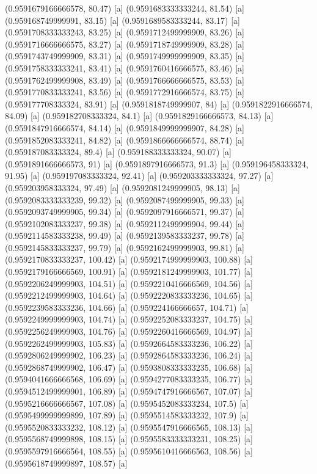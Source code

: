 {{{(0.9591679166666578, 80.47) [a] 
(0.9591683333333244, 81.54) [a] 
(0.959168749999991, 83.15) [a] 
(0.9591689583333244, 83.17) [a] 
(0.9591708333333243, 83.25) [a] 
(0.9591712499999909, 83.26) [a] 
(0.9591716666666575, 83.27) [a] 
(0.9591718749999909, 83.28) [a] 
(0.9591743749999909, 83.31) [a] 
(0.9591749999999909, 83.35) [a] 
(0.9591758333333241, 83.41) [a] 
(0.9591760416666575, 83.46) [a] 
(0.9591762499999908, 83.49) [a] 
(0.9591766666666575, 83.53) [a] 
(0.9591770833333241, 83.56) [a] 
(0.9591772916666574, 83.75) [a] 
(0.959177708333324, 83.91) [a] 
(0.9591818749999907, 84) [a] 
(0.9591822916666574, 84.09) [a] 
(0.959182708333324, 84.1) [a] 
(0.9591829166666573, 84.13) [a] 
(0.9591847916666574, 84.14) [a] 
(0.9591849999999907, 84.28) [a] 
(0.9591852083333241, 84.82) [a] 
(0.9591866666666574, 88.74) [a] 
(0.959187083333324, 89.4) [a] 
(0.959188333333324, 90.07) [a] 
(0.9591891666666573, 91) [a] 
(0.9591897916666573, 91.3) [a] 
(0.959196458333324, 91.95) [a] 
(0.959197083333324, 92.41) [a] 
(0.959203333333324, 97.27) [a] 
(0.959203958333324, 97.49) [a] 
(0.9592081249999905, 98.13) [a] 
(0.9592083333333239, 99.32) [a] 
(0.9592087499999905, 99.33) [a] 
(0.9592093749999905, 99.34) [a] 
(0.9592097916666571, 99.37) [a] 
(0.9592102083333237, 99.38) [a] 
(0.9592112499999904, 99.44) [a] 
(0.9592114583333238, 99.49) [a] 
(0.9592139583333237, 99.78) [a] 
(0.9592145833333237, 99.79) [a] 
(0.9592162499999903, 99.81) [a] 
(0.9592170833333237, 100.42) [a] 
(0.9592174999999903, 100.88) [a] 
(0.9592179166666569, 100.91) [a] 
(0.9592181249999903, 101.77) [a] 
(0.9592206249999903, 104.51) [a] 
(0.9592210416666569, 104.56) [a] 
(0.9592212499999903, 104.64) [a] 
(0.9592220833333236, 104.65) [a] 
(0.9592239583333236, 104.66) [a] 
(0.959224166666657, 104.71) [a] 
(0.9592249999999903, 104.74) [a] 
(0.9592252083333237, 104.75) [a] 
(0.9592256249999903, 104.76) [a] 
(0.9592260416666569, 104.97) [a] 
(0.9592262499999903, 105.83) [a] 
(0.9592664583333236, 106.22) [a] 
(0.9592806249999902, 106.23) [a] 
(0.9592864583333236, 106.24) [a] 
(0.9592868749999902, 106.47) [a] 
(0.9593808333333235, 106.68) [a] 
(0.9594041666666568, 106.69) [a] 
(0.9594277083333235, 106.77) [a] 
(0.9594512499999901, 106.89) [a] 
(0.9594747916666567, 107.07) [a] 
(0.9595216666666567, 107.08) [a] 
(0.9595452083333234, 107.5) [a] 
(0.9595499999999899, 107.89) [a] 
(0.9595514583333232, 107.9) [a] 
(0.9595520833333232, 108.12) [a] 
(0.9595547916666565, 108.13) [a] 
(0.9595568749999898, 108.15) [a] 
(0.9595583333333231, 108.25) [a] 
(0.9595597916666564, 108.55) [a] 
(0.9595610416666563, 108.56) [a] 
(0.9595618749999897, 108.57) [a] 
}}}
